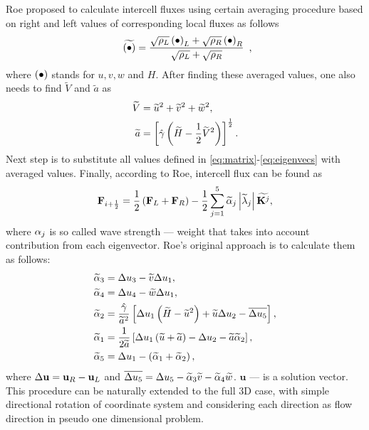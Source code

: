 Roe proposed to calculate intercell fluxes using certain averaging procedure based on right and left values of corresponding local fluxes \cite{lib:Roe} as follows
\begin{align}
\begin{array}{c}
\widetilde {\left(\bullet\right)} = \displaystyle \frac {\sqrt {\rho_L} \left(\bullet\right)_L + \sqrt {\rho_R} \left(\bullet\right)_R}{\sqrt{\rho_L} + \sqrt{\rho_R}}
\end{array},
\end{align}
where $\left(\bullet\right)$ stands for $u, v, w$ and $H$. After finding these averaged values, one also needs to find $\widetilde V$ and $\widetilde a$ as 
\begin{align*}
\widetilde V &= \widetilde u^2 + \widetilde v^2 + \widetilde w^2, \\
\widetilde a &= \left[\hat {\gamma} \left(\widetilde H - \frac 12 \widetilde V^2\right)\right]^{\frac 12}.
\end{align*}
Next step is to substitute all values defined in \eqref{eq:matrix}-\eqref{eq:eigenvecs} with averaged values. Finally, according to Roe, intercell flux can be found as
\begin{align}
\mathbf F_{i+\frac 12} = \frac 12 \left(\mathbf F_L + \mathbf F_R\right) - \frac 12 \sum_{j = 1}^5 	\widetilde {\alpha}_j \left|\widetilde {\lambda}_j\right| \widetilde {\mathbf K^j},
\end{align}
where $\alpha_j$ is so called wave strength --- weight that takes into account contribution from each eigenvector. Roe's original approach is to calculate them as follows:
\begin{align}
\nonumber
\widetilde {\alpha}_3 &= \Delta u_3 - \widetilde v \Delta u_1, \\
\nonumber
\widetilde {\alpha}_4 &= \Delta u_4 - \widetilde w \Delta u_1, \\
\widetilde {\alpha}_2 &= \frac {\hat {\gamma}}{\widetilde a^2} \left[\Delta u_1 \left(\widetilde H - \widetilde u^2\right) + \widetilde u \Delta u_2 - \overline{\Delta u_5}\right], \\
\nonumber
\widetilde {\alpha}_1 &= \frac 1{2 \widetilde a} \left[\Delta u_1 \left(\widetilde u + \widetilde a\right) - \Delta u_2 - \widetilde a \widetilde {\alpha}_2\right], \\
\nonumber
\widetilde {\alpha}_5 &= \Delta u_1 - \left(\widetilde {\alpha}_1 + \widetilde {\alpha}_2\right),
\end{align}
where $\Delta \mathbf u = \mathbf u_R - \mathbf u_L$ and $\overline{\Delta u_5} = \Delta u_5 - \widetilde {\alpha}_3 \widetilde v - \widetilde {\alpha}_4 \widetilde w$. $\mathbf u$ --- is a solution vector. This procedure can be naturally extended to the full 3D case, with simple directional rotation of coordinate system and considering each direction as flow direction in pseudo one dimensional problem.






